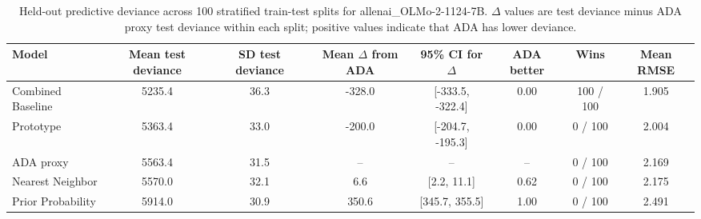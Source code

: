 \begin{table}

\caption{\label{tab:repeated-split-deviance-allenai-olmo-2-1124-7b}Held-out predictive deviance across 100 stratified train-test splits for allenai_OLMo-2-1124-7B. $\Delta$ values are test deviance minus ADA proxy test deviance within each split; positive values indicate that ADA has lower deviance.}
\centering
\begin{tabular}[t]{lccccccc}
\toprule
Model & Mean test deviance & SD test deviance & Mean $\Delta$ from ADA & 95\% CI for $\Delta$ & ADA better & Wins & Mean RMSE\\
\midrule
Combined Baseline & 5235.4 & 36.3 & -328.0 & {}[-333.5, -322.4] & 0.00 & 100 / 100 & 1.905\\
Prototype & 5363.4 & 33.0 & -200.0 & {}[-204.7, -195.3] & 0.00 & 0 / 100 & 2.004\\
ADA proxy & 5563.4 & 31.5 & -- & -- & -- & 0 / 100 & 2.169\\
Nearest Neighbor & 5570.0 & 32.1 & 6.6 & {}[2.2, 11.1] & 0.62 & 0 / 100 & 2.175\\
Prior Probability & 5914.0 & 30.9 & 350.6 & {}[345.7, 355.5] & 1.00 & 0 / 100 & 2.491\\
\bottomrule
\end{tabular}
\end{table}
